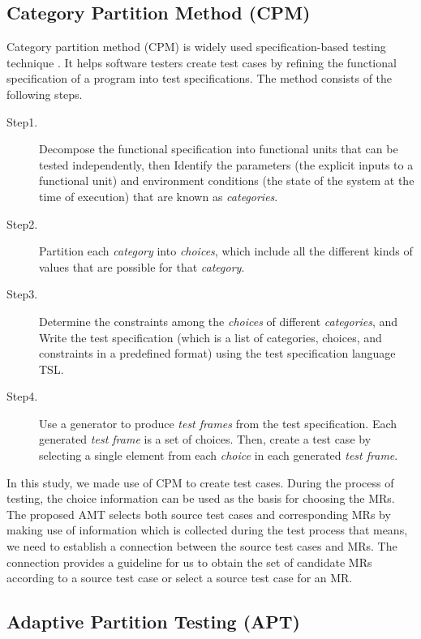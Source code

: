 \documentclass[10pt,journal,compsoc]{IEEEtran}
\begin{document}
\subsection{Category Partition Method (CPM)}
\label{sec:cpm}

Category partition method (CPM) is widely used specification-based testing technique \cite{ostrand1988category}. It helps software testers create test cases by refining the functional specification of a program into test specifications. The method consists of the following steps.

\begin{description}
  \item [Step1.]
  Decompose the functional specification into functional units that can be tested independently, then Identify the parameters (the explicit inputs to a functional unit) and environment conditions (the state of the system at the time of execution) that are known as \emph{categories}.
  \item [Step2.]
  Partition each \emph{category} into \emph{choices}, which include all the different kinds of values that are possible for that \emph{category}.
  \item [Step3.]
  Determine the constraints among the \emph{choices} of different \emph{categories}, and Write the test specification (which is a list of categories, choices, and constraints in a predefined format) using the test specification language TSL.
  \item [Step4.]
  Use a generator to produce \emph{test frames} from the test specification. Each generated \emph{test frame} is a set of choices. Then, create a test case by selecting a single element from each \emph{choice} in each generated \emph{test frame}.
\end{description}

In this study, we made use of CPM to create test cases. During the process of testing, the choice information can be used as the basis for choosing the MRs. The proposed AMT selects both source test cases and corresponding MRs by making use of information which is collected during the test process that means, we need to establish a connection between the source test cases and MRs. The connection provides a guideline for us to obtain the set of candidate MRs according to a source test case or select a source test case for an MR.

\subsection{Adaptive Partition Testing (APT)}
\label{sec:apt}
\end{document}

